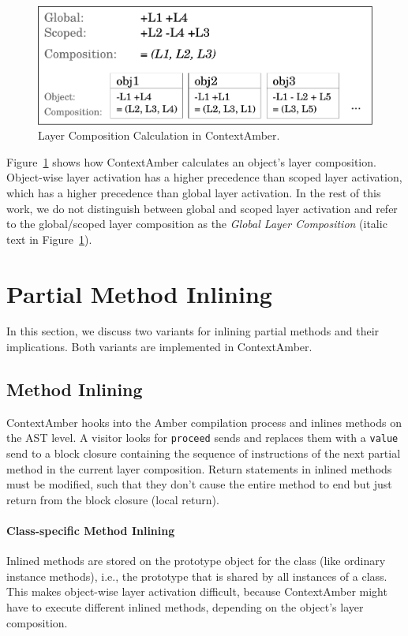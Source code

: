 \documentclass{sig-alternate}
\newcommand{\todo}[1]{{\color{red}[[TODO: {\emph{#1}}]]}}
\begin{document}
\begin{figure}[!htp]
    \includegraphics[width=\columnwidth]{layer_composition_calculation.pdf}
    \caption{Layer Composition Calculation in ContextAmber.}
    \label{fig:layer_composition_calculation}
\end{figure}

Figure~\ref{fig:layer_composition_calculation} shows how ContextAmber calculates an object's layer composition. Object-wise layer activation has a higher precedence than scoped layer activation, which has a higher precedence than global layer activation. In the rest of this work, we do not distinguish between global and scoped layer activation and refer to the global/scoped layer composition as the \emph{Global Layer Composition} (italic text in Figure~\ref{fig:layer_composition_calculation}).

\section{Partial Method Inlining}
\label{sec:inlining}
\label{sec:partial_method_inlining}
In this section, we discuss two variants for inlining partial methods and their implications. Both variants are implemented in ContextAmber.

\subsection{Method Inlining}
ContextAmber hooks into the Amber compilation process and inlines methods on the AST level. A visitor looks for \texttt{proceed} sends and replaces them with a \texttt{value} send to a block closure containing the sequence of instructions of the next partial method in the current layer composition. Return statements in inlined methods must be modified, such that they don't cause the entire method to end but just return from the block closure (local return). 

\paragraph{Class-specific Method Inlining}
Inlined methods are stored on the prototype object for the class (like ordinary instance methods), i.e., the prototype that is shared by all instances of a class. This makes object-wise layer activation difficult, because ContextAmber might have to execute different inlined methods, depending on the object's layer composition.
\end{document}
